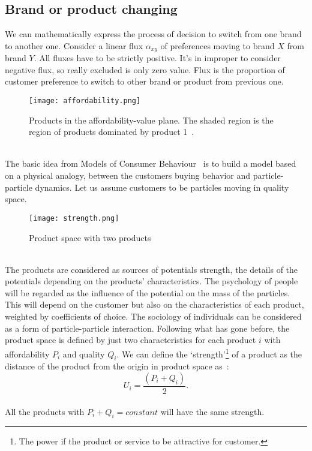 \subsection{Brand or product changing} \label{subsec:brand}
We can mathematically express the process of decision to switch from one brand to another one.
Consider a linear flux $\alpha_{xy}$ of preferences moving to brand $X$ from brand $Y$.
All fluxes have to be strictly positive.
It's in improper to consider negative flux, so really excluded is only zero value.
Flux is the proportion of customer preference to switch to other brand or product from previous one.
\begin{figure}[h!]
	\begin{center}
		\texttt{[image: affordability.png]}
	\end{center}
	\caption{Products in the affordability-value plane.
	The shaded region is the region of products dominated by product 1~\cite{pantland}.}
	\label{Affordability of products}
\end{figure}
\\
The basic idea from Models of Consumer Behaviour~\cite{patel} is to build a model based on a physical analogy,
between the customers buying behavior and particle-particle dynamics.
Let us assume customers to be particles moving in quality space.\\
\begin{figure}[h!]
	\begin{center}
		\texttt{[image: strength.png]}
	\end{center}
	\caption{Product space with two products~\cite{patel}}
	\label{Strength of products}
\end{figure}
\\
The products are considered as sources of  potentials strength, the details of the potentials depending on the products’ characteristics.
The psychology of people will be regarded as the influence of the potential on the mass of the particles.
This will depend on the customer but also on the characteristics of each product, weighted by coefficients of choice.
The sociology of individuals can be considered as a form of particle-particle interaction. Following what has gone before,
the product space is defined by just two characteristics for each product $i$ with affordability $P_i$ and quality $Q_i$.
We can define the ‘strength’\footnote{The power if the product or service to be attractive for customer.} of a product as
the distance of the product from the origin in product space as~\cite{pantland}:
\\
\begin{equation} \label{eq:12}
U_i = \frac{(P_i + Q_i)}{2}.
\end{equation}
\\
All the products with $P_i + Q_i = constant$ will have the same strength.
